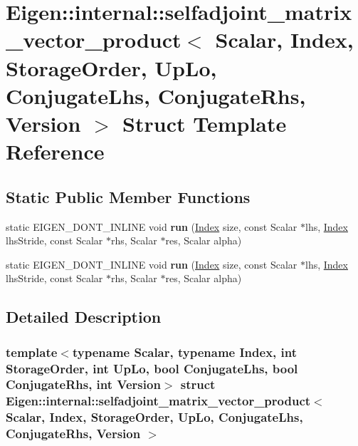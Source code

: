 \hypertarget{struct_eigen_1_1internal_1_1selfadjoint__matrix__vector__product}{}\section{Eigen\+:\+:internal\+:\+:selfadjoint\+\_\+matrix\+\_\+vector\+\_\+product$<$ Scalar, Index, Storage\+Order, Up\+Lo, Conjugate\+Lhs, Conjugate\+Rhs, Version $>$ Struct Template Reference}
\label{struct_eigen_1_1internal_1_1selfadjoint__matrix__vector__product}
\subsection*{Static Public Member Functions}
\begin{DoxyCompactItemize}
\item 
\mbox{\label{struct_eigen_1_1internal_1_1selfadjoint__matrix__vector__product_aff9204e97b5c0a7887b0619c6305dd34}} 
static E\+I\+G\+E\+N\+\_\+\+D\+O\+N\+T\+\_\+\+I\+N\+L\+I\+NE void {\bfseries run} (\hyperlink{namespace_eigen_a62e77e0933482dafde8fe197d9a2cfde}{Index} size, const Scalar $\ast$lhs, \hyperlink{namespace_eigen_a62e77e0933482dafde8fe197d9a2cfde}{Index} lhs\+Stride, const Scalar $\ast$rhs, Scalar $\ast$res, Scalar alpha)
\item 
\mbox{\label{struct_eigen_1_1internal_1_1selfadjoint__matrix__vector__product_af5a95eaddf18ae10e3fb96483681eeca}} 
static E\+I\+G\+E\+N\+\_\+\+D\+O\+N\+T\+\_\+\+I\+N\+L\+I\+NE void {\bfseries run} (\hyperlink{namespace_eigen_a62e77e0933482dafde8fe197d9a2cfde}{Index} size, const Scalar $\ast$lhs, \hyperlink{namespace_eigen_a62e77e0933482dafde8fe197d9a2cfde}{Index} lhs\+Stride, const Scalar $\ast$rhs, Scalar $\ast$res, Scalar alpha)
\end{DoxyCompactItemize}


\subsection{Detailed Description}
\subsubsection*{template$<$typename Scalar, typename Index, int Storage\+Order, int Up\+Lo, bool Conjugate\+Lhs, bool Conjugate\+Rhs, int Version$>$\newline
struct Eigen\+::internal\+::selfadjoint\+\_\+matrix\+\_\+vector\+\_\+product$<$ Scalar, Index, Storage\+Order, Up\+Lo, Conjugate\+Lhs, Conjugate\+Rhs, Version $>$}



